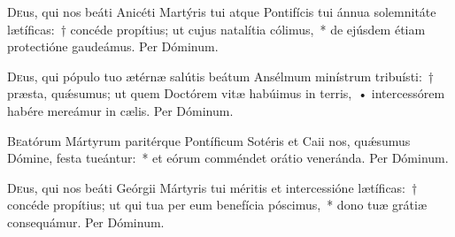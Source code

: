 \documentclass[vesperale_romanum.tex]{subfiles}
\begin{document}
\myrule
{}

\oratio

\lettrine{D}{e}us, qui nos beáti Anicéti Martýris tui atque Pontifícis tui ánnua sole\-mnitáte lætíficas:~† concéde propítius; ut cujus natalítia cólimus,~* de ejúsdem étiam prote\-ctióne gaudeámus. Per Dóminum.

\myrule
{}

\duplex

\odoctoroptime

\oratio

\lettrine{D}{e}us, qui pópulo tuo ætérnæ salútis beátum Ansélmum minístrum tribuísti:~† præsta, quǽsumus; ut quem Do\-ctórem vitæ habúimus in terris,~• intercessórem habére mereámur in cælis. Per Dóminum.

\commsequentis

\myrule
{}

\semiduplex


\oratio

\lettrine{B}{e}atórum Mártyrum paritérque Pontíficum Sotéris et Caii nos, quǽsumus Dómine, festa tueántur:~* et eórum comméndet orátio veneránda. Per Dóminum.

\capitdeseq

\myrule
{}

\semiduplex

\oratio

\lettrine{D}{e}us, qui nos beáti Geórgii Mártyris tui méritis et intercessióne lætíficas:~† concéde propítius; ut qui tua per eum benefícia póscimus,~* dono tuæ grátiæ consequámur.
Per Dóminum.


\vespsequentiscomm

\myrule
{}
\end{document}
